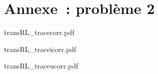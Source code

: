 \documentclass[a4paper, 10pt, garamond, oneside]{book}
\begin{document}
{	\chapter{Annexe~: problème 2}
	\begin{center}
		{transRL_tracecorr.pdf}
		\label{fig:annexe_p2-1_corr}
	\end{center}
	\begin{center}
		{transRL_traceicorr.pdf}
		\label{fig:annexe_p2-2_corr}
	\end{center}
	\begin{center}
		{transRL_traceucorr.pdf}
		\label{fig:annexe_p2-3_corr}
	\end{center}
}
\vspace{-20pt}
\end{document}
